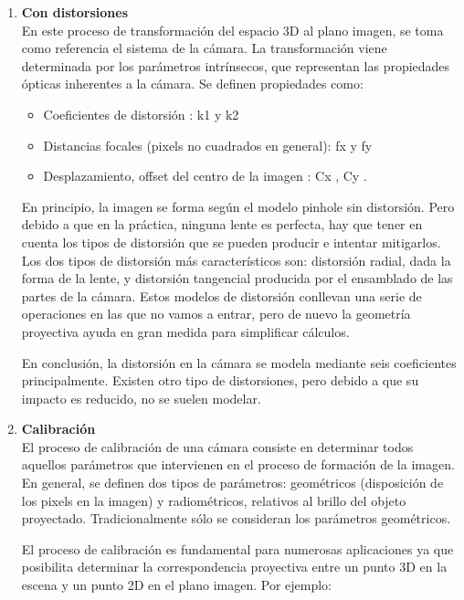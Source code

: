 \documentclass[a4,10pt]{article}
\begin{document}
\begin{enumerate}
\item \textbf{Con distorsiones}\\
En este proceso de transformación del espacio 3D al plano imagen, se toma como referencia el sistema de la cámara. La transformación viene determinada por los parámetros intrínsecos, que representan las propiedades ópticas inherentes a la cámara. Se definen propiedades como:
\begin {itemize}
\item Coeficientes de distorsión : k1 y k2
\item Distancias focales (pixels no cuadrados en general): fx y fy
\item Desplazamiento, offset del centro de la imagen : Cx , Cy .
\end {itemize}
En principio, la imagen se forma según el modelo pinhole sin distorsión. Pero debido a que en la práctica, ninguna lente es perfecta, hay que tener en cuenta los tipos de distorsión que se pueden producir e intentar mitigarlos. Los dos tipos de distorsión más característicos son: distorsión radial, dada la forma de la lente, y distorsión tangencial producida por el ensamblado de las partes de la cámara. Estos modelos de distorsión conllevan una serie de operaciones en las que no vamos a entrar, pero de nuevo la geometría proyectiva ayuda en gran medida para simplificar cálculos.

En conclusión, la distorsión en la cámara se modela mediante seis coeficientes principalmente. Existen otro tipo de distorsiones, pero debido a que su impacto es reducido, no se suelen modelar.


\item \textbf{Calibración}\\
El proceso de calibración de una cámara consiste en determinar todos aquellos parámetros que intervienen en el proceso de formación de la imagen. En general, se definen dos tipos de parámetros: geométricos (disposición de los pixels en la imagen) y radiométricos, relativos al brillo del objeto proyectado. Tradicionalmente sólo se consideran los parámetros geométricos.

El proceso de calibración es fundamental para numerosas aplicaciones ya que posibilita determinar la correspondencia proyectiva entre un punto 3D en la escena y un punto 2D en el plano imagen. Por ejemplo:


\end{enumerate}
\end{document}

